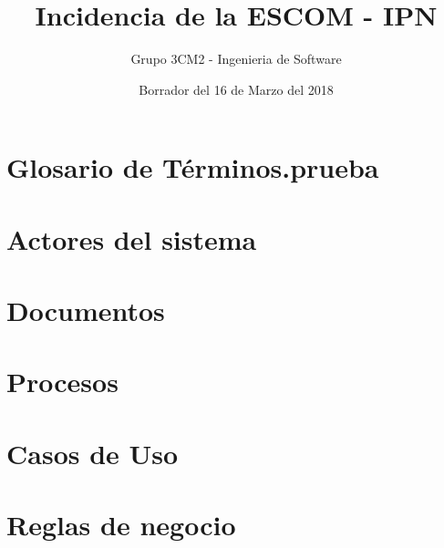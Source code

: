 \documentclass[11pt]{book}
\title{Incidencia de la ESCOM - IPN}
\author{Grupo 3CM2 - Ingenieria de Software}
\date{\color{red}Borrador del 16 de Marzo del 2018}
\begin{document}
    
   
    \maketitle
    
    \tableofcontents
    \listoftables
    \listoffigures
   
    \chapter{Glosario de Términos.prueba}
    
    
    \chapter{Actores del sistema}
    
    
    \chapter{Documentos}
    
    
    \chapter{Procesos}
    
    
    \chapter{Casos de Uso}
    
    
    \chapter{Reglas de negocio}
    
    
    
\end{document}
